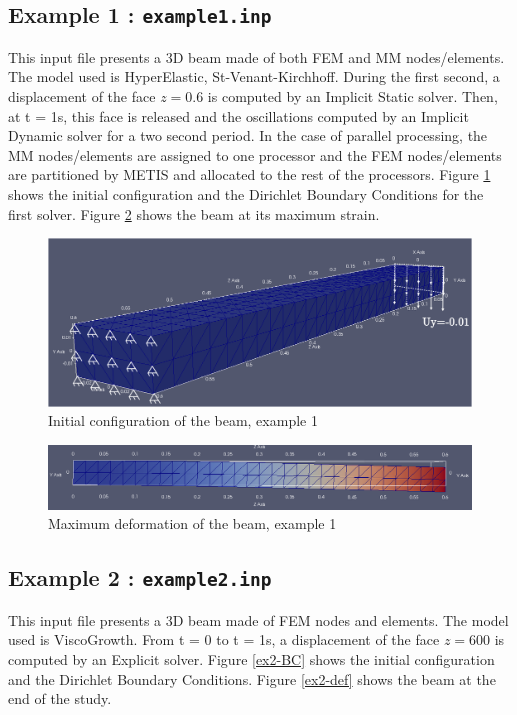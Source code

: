 \documentclass[oneside,11pt,times]{book}
\begin{document}
\newpage
\subsection{Example 1 : \texttt{example1.inp}}
This input file presents a 3D beam made of both FEM and MM nodes/elements. The model used is HyperElastic, St-Venant-Kirchhoff. During the first second, a displacement of the face $z=0.6$ is computed by an Implicit Static solver. Then, at t = 1s, this face is released and the oscillations computed by an Implicit Dynamic solver for a two second period. In the case of parallel processing, the MM nodes/elements are assigned to one processor and the FEM nodes/elements are partitioned by METIS and allocated to the rest of the processors.
\medbreak
Figure \ref{ex1-BC} shows the initial configuration and the Dirichlet Boundary Conditions for the first solver. Figure \ref{ex1-disp} shows the beam at its maximum strain.

\begin{figure}[h!]
    \centering
    \includegraphics[scale=0.35]{imgs/Examples/ex1-BC.png}
    \caption{Initial configuration of the beam, example 1}
    \label{ex1-BC}
\end{figure}

\begin{figure}[h!]
    \centering
        \includegraphics[scale=0.35]{imgs/Examples/ex1-disp.png}
    \caption{Maximum deformation of the beam, example 1}
    \label{ex1-disp}
\end{figure}

\newpage
\subsection{Example 2 : \texttt{example2.inp}}
This input file presents a 3D beam made of FEM nodes and elements. The model used is ViscoGrowth. From t = 0 to t = 1s, a displacement of the face $z=600$ is computed by an Explicit solver.
\medbreak
Figure \ref{ex2-BC} shows the initial configuration and the Dirichlet Boundary Conditions. Figure \ref{ex2-def} shows the beam at the end of the study.
\end{document}
